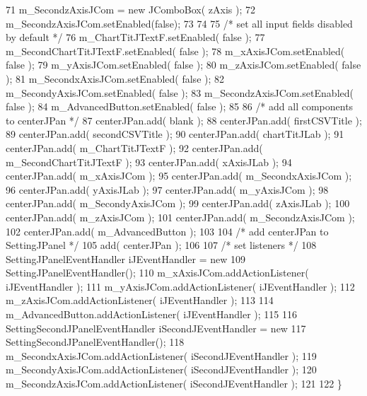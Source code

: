 \begin{DoxyCode}
71         m\_SecondzAxisJCom = \textcolor{keyword}{new} JComboBox( zAxis );
72         m\_SecondzAxisJCom.setEnabled(\textcolor{keyword}{false});
73         
74         
75         \textcolor{comment}{/* set all input fields disabled by default */}
76         m\_ChartTitJTextF.setEnabled( \textcolor{keyword}{false} );
77         m\_SecondChartTitJTextF.setEnabled( \textcolor{keyword}{false} );
78         m\_xAxisJCom.setEnabled( \textcolor{keyword}{false} );
79         m\_yAxisJCom.setEnabled( \textcolor{keyword}{false} );
80         m\_zAxisJCom.setEnabled( \textcolor{keyword}{false} );
81         m\_SecondxAxisJCom.setEnabled( \textcolor{keyword}{false} );
82         m\_SecondyAxisJCom.setEnabled( \textcolor{keyword}{false} );
83         m\_SecondzAxisJCom.setEnabled( \textcolor{keyword}{false} );
84         m\_AdvancedButton.setEnabled( \textcolor{keyword}{false} );
85         
86         \textcolor{comment}{/* add all components to centerJPan */}
87         centerJPan.add( blank );
88         centerJPan.add( firstCSVTitle );
89         centerJPan.add( secondCSVTitle );
90         centerJPan.add( chartTitJLab );
91         centerJPan.add( m\_ChartTitJTextF );
92         centerJPan.add( m\_SecondChartTitJTextF );
93         centerJPan.add( xAxisJLab );
94         centerJPan.add( m\_xAxisJCom );
95         centerJPan.add( m\_SecondxAxisJCom );
96         centerJPan.add( yAxisJLab );
97         centerJPan.add( m\_yAxisJCom );
98         centerJPan.add( m\_SecondyAxisJCom );
99         centerJPan.add( zAxisJLab );
100         centerJPan.add( m\_zAxisJCom );
101         centerJPan.add( m\_SecondzAxisJCom );
102         centerJPan.add( m\_AdvancedButton );
103         
104         \textcolor{comment}{/* add centerJPan to SettingJPanel */}
105         add( centerJPan );
106         
107         \textcolor{comment}{/* set listeners */}
108         SettingJPanelEventHandler iJEventHandler = \textcolor{keyword}{new} 
109                 SettingJPanelEventHandler();
110         m\_xAxisJCom.addActionListener( iJEventHandler );
111         m\_yAxisJCom.addActionListener( iJEventHandler );
112         m\_zAxisJCom.addActionListener( iJEventHandler );
113         
114         m\_AdvancedButton.addActionListener( iJEventHandler ); 
115         
116         SettingSecondJPanelEventHandler iSecondJEventHandler = \textcolor{keyword}{new} 
117                 SettingSecondJPanelEventHandler();
118         m\_SecondxAxisJCom.addActionListener( iSecondJEventHandler );
119         m\_SecondyAxisJCom.addActionListener( iSecondJEventHandler );
120         m\_SecondzAxisJCom.addActionListener( iSecondJEventHandler );
121         
122     \}
\end{DoxyCode}



